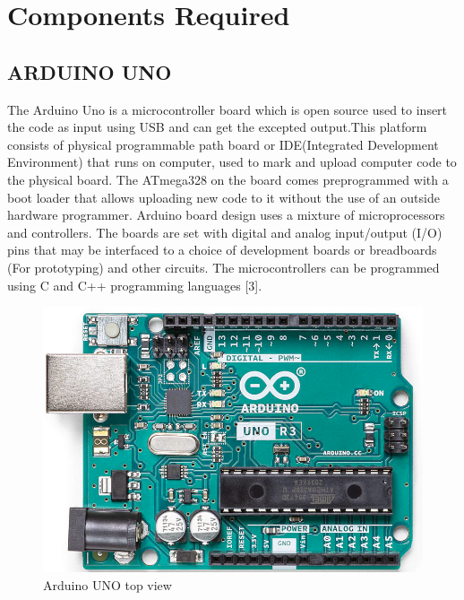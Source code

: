 \documentclass[conference]{IEEEtran}
\begin{document}
    \section{Components Required}


    \subsection{ARDUINO UNO}\label{AA}
    The Arduino Uno is a microcontroller board which is open
    source used to insert the code as input using USB and can get
    the excepted output.This platform consists of physical
    programmable path board or IDE(Integrated Development
    Environment) that runs on computer, used to mark and
    upload computer code to the physical board. The
    ATmega328 on the board comes preprogrammed with a
    boot loader that allows uploading new code to it without the
    use of an outside hardware programmer. Arduino board
    design uses a mixture of microprocessors and controllers.
    The
    boards
    are
    set
    with
    digital
    and
    analog input/output (I/O) pins that may be interfaced to a
    choice of development boards or breadboards (For
    prototyping) and other circuits. The microcontrollers can be
    programmed using C and C++ programming languages [3].

    \begin{figure}[htbp]
        \centerline{\includegraphics[scale=0.30]{fig3.png}}
        \caption{Arduino UNO top view}
        \label{fig}
    \end{figure}
\end{document}
